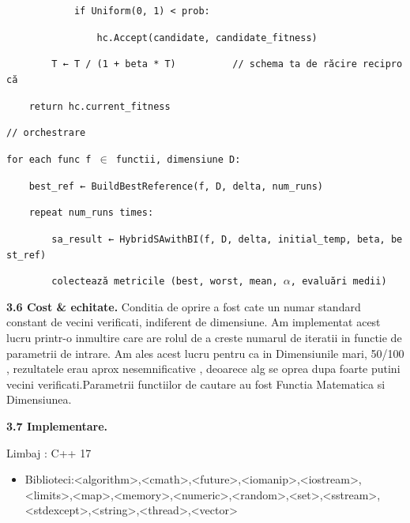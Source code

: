 \documentclass[
]{article}
\begin{document}
\texttt{\ \ \ \ \ \ \ \ \ \ \ \ if\ }\texttt{Uniform(}\texttt{0,\ 1)\ \textless{}\ prob:}

\texttt{\ \ \ \ \ \ \ \ \ \ \ \ \ \ \ \ }\texttt{hc.Accept}\texttt{(candidate,\ }\texttt{candidate\_fitness}\texttt{)}

\texttt{\ \ \ \ \ \ \ \ T\ ←\ T\ /\ (1\ +\ beta\ *\ }\texttt{T)\ \ \ }\texttt{\ \ \ \ \ \ \ //\ schema\ ta\ de\ }\texttt{răcire}\texttt{\ }\texttt{reciprocă}

\texttt{\ \ \ \ return\ }\texttt{hc.current}\texttt{\_fitness}

\texttt{//\ }\texttt{orchestrare}

\texttt{for\ each\ }\texttt{func}\texttt{\ f\ }\texttt{$\in$}\texttt{\ }\texttt{functii}\texttt{,\ }\texttt{dimensiune}\texttt{\ D:}

\texttt{\ \ \ \ }\texttt{best\_ref}\texttt{\ ←\ }\texttt{BuildBestReference}\texttt{(}\texttt{f,\ D,\ delta,\ }\texttt{num\_runs}\texttt{)}

\texttt{\ \ \ \ repeat\ }\texttt{num\_runs}\texttt{\ times:}

\texttt{\ \ \ \ \ \ \ \ }\texttt{sa\_result}\texttt{\ ←\ }\texttt{HybridSAwithBI}\texttt{(}\texttt{f,\ D,\ delta,\ }\texttt{initial\_temp}\texttt{,\ beta,\ }\texttt{best\_ref}\texttt{)}

\texttt{\ \ \ \ \ \ \ \ }\texttt{colectează}\texttt{\ }\texttt{metricile}\texttt{\ (best,\ worst,\ mean,\ $\alpha$,\ }\texttt{evaluări}\texttt{\ }\texttt{medii}\texttt{)\ }

\textbf{3.6 Cost \& echitate.} Conditia de oprire a fost cate un numar
standard constant de vecini verificati, indiferent de dimensiune. Am
implementat acest lucru printr-o inmultire care are rolul de a creste
numarul de iteratii in functie de parametrii de intrare. Am ales acest
lucru pentru ca in Dimensiunile mari, 50/100 , rezultatele erau aprox
nesemnificative , deoarece alg se oprea dupa foarte putini vecini
verificati.Parametrii functiilor de cautare au fost Functia Matematica
si Dimensiunea.

\textbf{3.7 Implementare.}

Limbaj : C++ 17

\begin{itemize}
\item
  Biblioteci:\textless algorithm\textgreater,\textless cmath\textgreater,\textless future\textgreater,\textless iomanip\textgreater,\textless iostream\textgreater,\textless limits\textgreater,\textless map\textgreater,\textless memory\textgreater,\textless numeric\textgreater,\textless random\textgreater,\textless set\textgreater,\textless sstream\textgreater,\textless stdexcept\textgreater,\textless string\textgreater,\textless thread\textgreater,\textless vector\textgreater{}
\end{itemize}
\end{document}
